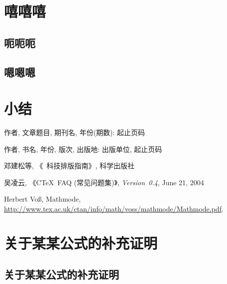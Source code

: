 \documentclass[forprint]{HNUthesis}
\begin{document}
\chapter{嘻嘻嘻}

\section{呃呃呃}

\section{嗯嗯嗯}

\chapter{小结}

\cleardoublepage{}
{}
\begin{thebibliography}{000}

   作者, 文章题目, 期刊名, 年份(期数): 起止页码

   作者, 书名, 年份, 版次, 出版地: 出版单位, 起止页码

   邓建松等, 《\LaTeXe~科技排版指南》, 科学出版社

   吴凌云, 《CTeX~FAQ (常见问题集)》, \textit{Version~0.4}, June 21, 2004

   Herbert Vo\ss, Mathmode, \url{http://www.tex.ac.uk/ctan/info/math/voss/mathmode/Mathmode.pdf}.

\end{thebibliography}

\appendix
\chapter{关于某某公式的补充证明} \label{sec}
\section*{关于某某公式的补充证明}

\backmatter

\cleardoublepage
\end{document}

